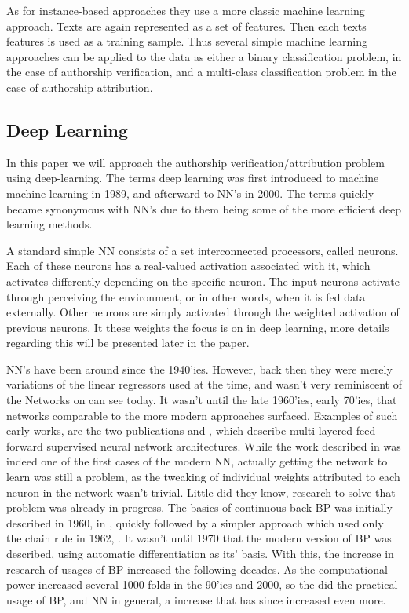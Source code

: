 As for instance-based approaches they use a more classic machine learning
approach. Texts are again represented as a set of features. Then each texts
features is used as a training sample. Thus several simple machine learning
approaches can be applied to the data as either a binary classification problem,
in the case of authorship verification, and a multi-class classification problem
in the case of authorship attribution.

\subsection{Deep Learning} 

In this paper we will approach the authorship verification/attribution problem
using deep-learning. The terms deep learning was first introduced to machine
machine learning in 1989, and afterward to \gls{NN}'s in 2000. The terms quickly
became synonymous with \gls{NN}'s due to them being some of the more efficient
deep learning methods.\cite{Schmidhuber:2015} 

A standard simple \gls{NN} consists of a set interconnected processors, called
neurons. Each of these neurons has a real-valued activation associated with
it, which activates differently depending on the specific neuron. The input
neurons activate through perceiving the environment, or in other words, when
it is fed data externally. Other neurons are simply activated through the
weighted activation of previous neurons. It these weights the focus is on in
deep learning, more details regarding this will be presented later in the
paper.\cite{DBLP:journals/corr/Schmidhuber14}

\gls{NN}'s have been around since the 1940'ies. However, back then they were
merely variations of the linear regressors used at the time, and wasn't
very reminiscent of the Networks on can see today. It wasn't until the
late 1960'ies, early 70'ies, that networks comparable to the more modern
approaches surfaced. Examples of such early works, are the two publications
\cite{ivakhnenko1973cybernetic} and \cite{4308320}, which describe multi-layered
feed-forward supervised neural network architectures. While the work described
in \cite{4308320} was indeed one of the first cases of the modern \gls{NN},
actually getting the network to learn was still a problem, as the tweaking of
individual weights attributed to each neuron in the network wasn't trivial.
Little did they know, research to solve that problem was already in progress.
The basics of continuous back \gls{BP} was initially described in 1960, in
\cite{Kelley1960}, quickly followed by a simpler approach which used only the
chain rule in 1962, \cite{DREYFUS196230}. It wasn't until 1970 that the modern
version of \gls{BP} was described, using automatic differentiation as its'
basis. With this, the increase in research of usages of \gls{BP} increased the
following decades. As the computational power increased several 1000 folds in
the 90'ies and 2000, so the did the practical usage of \gls{BP}, and \gls{NN} in
general, a increase that has since increased even more. \cite{Schmidhuber:2015}

